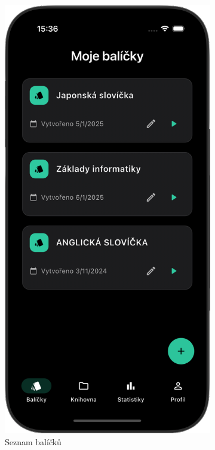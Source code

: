 \documentclass[12pt, a4paper, oneside]{report}
\begin{document}
	\begin{figure}[h]
		\centering
		\begin{subfigure}[b]{0.48\textwidth}
			\includegraphics[width=0.75\linewidth]{../image/screen-deck-list.png}
			\caption{Seznam balíčků}
			\label{fig:screen-decks}
		\end{subfigure}
		\hfill
		\begin{subfigure}[b]{0.48\textwidth}

\end{subfigure}
\end{figure}
\end{document}
